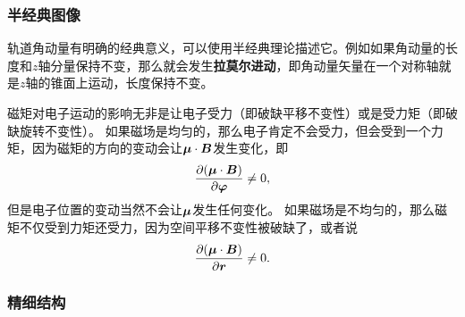 \documentclass[UTF8, a4paper]{ctexart}
\begin{document}
\subsubsection{半经典图像}

轨道角动量有明确的经典意义，可以使用半经典理论描述它。例如如果角动量的长度和$z$轴分量保持不变，那么就会发生\textbf{拉莫尔进动}，即角动量矢量在一个对称轴就是$z$轴的锥面上运动，长度保持不变。

磁矩对电子运动的影响无非是让电子受力（即破缺平移不变性）或是受力矩（即破缺旋转不变性）。
如果磁场是均匀的，那么电子肯定不会受力，但会受到一个力矩，因为磁矩的方向的变动会让$\vb*{\mu} \cdot \vb*{B}$发生变化，即
\[
    \pdv{(\vb*{\mu} \cdot \vb*{B})}{\vb*{\varphi}} \neq 0,
\]
但是电子位置的变动当然不会让$\vb*{\mu}$发生任何变化。
如果磁场是不均匀的，那么磁矩不仅受到力矩还受力，因为空间平移不变性被破缺了，或者说
\[
    \pdv{(\vb*{\mu} \cdot \vb*{B})}{\vb*{r}} \neq 0.
\]

\subsubsection{精细结构}
\end{document}
